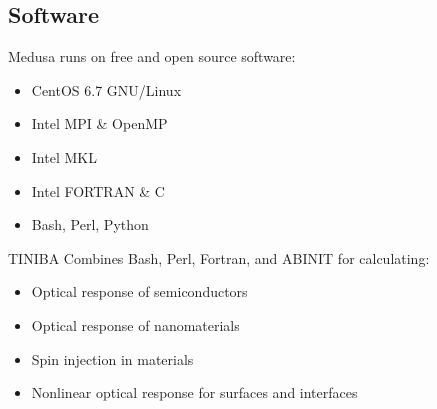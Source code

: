 \documentclass{beamer}
\begin{document}


\subsection{Software}

\begin{frame}
Medusa runs on free and open source software:
\begin{itemize}
\item CentOS 6.7 GNU/Linux
\item Intel MPI \& OpenMP
\item Intel MKL
\item Intel FORTRAN \& C
\item Bash, Perl, Python
\end{itemize}
\begin{block}{TINIBA}
Combines Bash, Perl, Fortran, and ABINIT for calculating:
\begin{itemize}
\item Optical response of semiconductors
\item Optical response of nanomaterials
\item Spin injection in materials
\item Nonlinear optical response for surfaces and interfaces
\end{itemize}
\end{block}
\end{frame}
\end{document}
